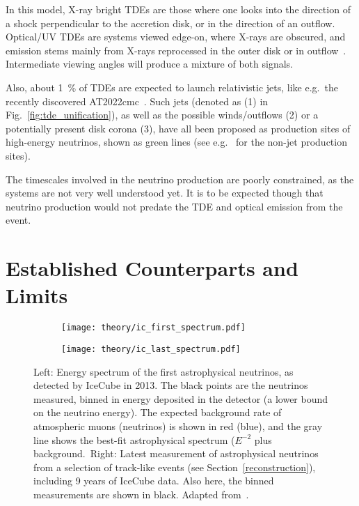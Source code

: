 In this model, X-ray bright TDEs are those where one looks into the direction of a shock perpendicular to the accretion disk, or in the direction of an outflow. Optical/UV TDEs are systems viewed edge-on, where X-rays are obscured, and emission stems mainly from X-rays reprocessed in the outer disk or in outflow~. Intermediate viewing angles will produce a mixture of both signals.

Also, about \SI{1}{\percent} of TDEs are expected to launch relativistic jets, like e.g.\ the recently discovered AT2022cmc~. Such jets (denoted as (1) in Fig.~\ref{fig:tde_unification}), as well as the possible winds/outflows (2) or a potentially present disk corona (3), have all been proposed as production sites of high-energy neutrinos, shown as green lines (see e.g.~ for the non-jet production sites).

The timescales involved in the neutrino production are poorly constrained, as the systems are not very well understood yet. It is to be expected though that neutrino production would not predate the TDE and optical emission from the event.

\section{Established Counterparts and Limits}

\begin{figure}[htb]
    \centering
    \begin{subfigure}[b]{0.52\textwidth}
        \centering
        \texttt{[image: theory/ic\_first\_spectrum.pdf]}
    \end{subfigure}
    \begin{subfigure}[b]{0.47\textwidth}
        \centering
        \texttt{[image: theory/ic\_last\_spectrum.pdf]}
    \end{subfigure}
    \caption[Astrophysical neutrino spectrum]{Left: Energy spectrum of the first astrophysical neutrinos, as detected by IceCube in 2013. The black points are the neutrinos measured, binned in energy deposited in the detector (a lower bound on the neutrino energy). The expected background rate of atmospheric muons (neutrinos) is shown in red (blue), and the gray line shows the best-fit astrophysical spectrum ($E^{-2}$ plus background.\ Right: Latest measurement of astrophysical neutrinos from a selection of track-like events (see Section~\ref{reconstruction}), including 9 years of IceCube data. Also here, the binned measurements are shown in black. Adapted from~\cite{Aartsen2013,Abbasi2022b}.}
\end{figure}


